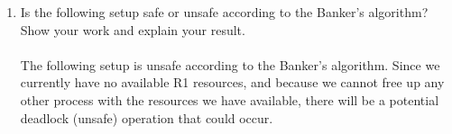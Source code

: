 \documentclass[12pt]{article}
\begin{document}
\begin{enumerate}
   \item Is the following setup safe or unsafe according to the Banker's algorithm? Show your work and explain your result. \\ \\
	The following setup is unsafe according to the Banker's algorithm. Since we currently have no available R1 resources, and because we cannot free up any other process with the resources we have available, there will be a potential deadlock (unsafe) operation that could occur.       
      
\end{enumerate}
\end{document}
